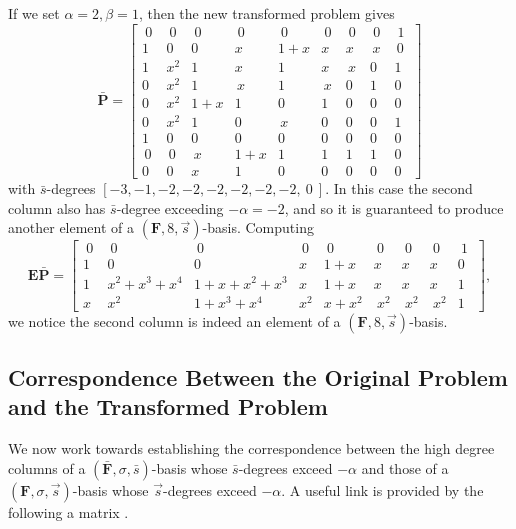 \begin{exmp}
If we set $\alpha=2,\beta=1$, then the new transformed problem gives
\[
\bar{\mathbf{P}}=\left[{\begin{array}{ccccccccc}
~0~ & ~0~ & ~0~ & ~0~ & ~0~ & ~0~ & ~0~ & ~0~ & ~1~\\
1 & 0 & 0 & x & 1+x & x & x & \, x\, & \,0\,\\
1 & x^{2} & 1 & x & 1 & x & \, x\, & 0 & 1\\
0 & x^{2} & 1 & \, x\, & 1 & \, x\, & 0 & 1 & 0\\
0 & x^{2} & 1+x & 1 & 0 & 1 & 0 & 0 & 0\\
0 & x^{2} & 1 & 0 & \, x\, & 0 & 0 & 0 & 1\\
1 & 0 & 0 & 0 & 0 & 0 & 0 & 0 & 0\\
\,0\, & \,0\, & \, x\, & 1+x & 1 & 1 & 1 & 1 & 0\\
0 & 0 & x & 1 & 0 & 0 & 0 & 0 & 0\end{array}}\right]\]
 with $\bar{s}$-degrees $[-3,-1,-2,-2,-2,-2,-2,-2,~0~]$. In this
case the second column also has $\bar{s}$-degree exceeding $-\alpha=-2$,
and so it is guaranteed to produce another element of a $(\mathbf{F},8,\vec{s})$-basis.
Computing \[
\mathbf{E}\bar{\mathbf{P}}=\left[{\begin{array}{ccccccccc}
~0~ & ~0~ & ~0~ & ~0~ & ~0~ & ~0~ & ~0~ & ~0~ & ~1~\\
1 & 0 & 0 & x & 1+x & x & x & x & 0\\
1 & x^{2}+x^{3}+x^{4} & 1+x+x^{2}+x^{3} & x & 1+x & x & x & x & 1\\
x & x^{2} & 1+x^{3}+x^{4} & x^{2} & x+x^{2} & ~x^{2} & ~x^{2} & ~x^{2} & 1\end{array}}\right],\]
 we notice the second column is indeed an element of a $(\mathbf{F},8,\vec{s})$-basis. 
\end{exmp}

\subsection{Correspondence Between the Original Problem and the Transformed Problem}

We now work towards establishing the correspondence between the high
degree columns of a $\left(\bar{\mathbf{F}},\sigma,\bar{s}\right)$-basis
whose $\bar{s}$-degrees exceed $-\alpha$ and those of a $\left(\mathbf{F},\sigma,\vec{s}\right)$-basis
whose $\vec{s}$-degrees exceed $-\alpha$. A useful link is provided
by the following a matrix .

